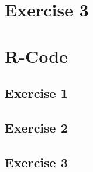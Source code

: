 \documentclass{article}
\begin{document}
  \section{Exercise 3}

  \section{R-Code}
    \subsection{Exercise 1}\label{sub:R1}

    \subsection{Exercise 2}\label{sub:R2}

    \subsection{Exercise 3}\label{sub:R3}
\end{document}
